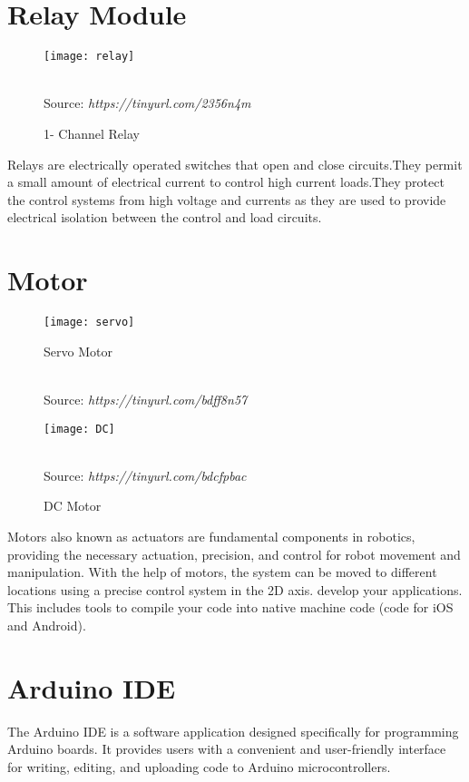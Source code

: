 \section{Relay Module}
\begin{figure}[h]
\centering  \texttt{[image: relay]}
\caption{1- Channel Relay}\\ 
Source: \textit{https://tinyurl.com/2356n4m}
\label{fig:Relay}
\end{figure}
Relays are electrically operated switches that open and close circuits.They permit a small amount of electrical current to control high current loads.They protect the control systems from high voltage and currents as they are used to provide electrical isolation between the control and load circuits.

\section{Motor}

\begin{figure}[h]
    \centering

    \begin{minipage}{0.49\textwidth}
        \centering
        \texttt{[image: servo]}
        \caption{Servo Motor}\\ 
        Source: \textit{https://tinyurl.com/bdff8n57}
        \label{fig:servo}
    \end{minipage}
    \hfill
    \begin{minipage}{0.49\textwidth}
        \centering
        \texttt{[image: DC]}
        \caption{DC Motor}\\ 
        Source: \textit{https://tinyurl.com/bdcfpbac}
        \label{fig:dc}
    \end{minipage}

\end{figure}
Motors also known as actuators are fundamental components in robotics, providing the necessary actuation, precision, and control for robot movement and manipulation. With the help of motors, the system can be moved to different locations using a precise control system in the 2D axis. develop your applications. This includes tools to compile your code into native machine code (code for iOS and Android).

\section{Arduino IDE}
The Arduino IDE is a software application designed specifically for programming Arduino boards. It provides users with a convenient and user-friendly interface for writing, editing, and uploading code to Arduino microcontrollers.

